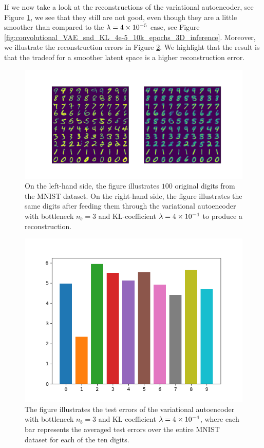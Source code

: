 If we now take a look at the reconstructions of the variational autoencoder, see Figure \ref{fig:convolutional_VAE_snd_KL_4e-4_10k_epochs_3D_inference}, we see that they still are not good, even though they are a little smoother than compared to the $\lambda = \num{4e-5}$ case, see Figure \ref{fig:convolutional_VAE_snd_KL_4e-5_10k_epochs_3D_inference}.
Moreover, we illustrate the reconstruction errors in Figure \ref{fig:convolutional_VAE_snd_KL_4e-4_10k_epochs_3D_errors}. We highlight that the result is that the tradeof for a smoother latent space is a higher reconstruction error.


\begin{figure}
\begin{center}
      \includegraphics[trim = 15mm 10mm 15mm 15mm, clip, width=\linewidth]{convolutional_VAE_snd_KL_4e-4_10k_epochs_3D_inference}
\end{center}
\caption{On the left-hand side, the figure illustrates $100$ original digits from the MNIST dataset. On the right-hand side, the figure illustrates the same digits after feeding them through the variational autoencoder with bottleneck $n_b=3$ and KL-coefficient $\lambda=\num{4e-4}$ to produce a reconstruction.}\label{fig:convolutional_VAE_snd_KL_4e-4_10k_epochs_3D_inference}
\end{figure}


\begin{figure}
\begin{center}
      \includegraphics[width=0.55\linewidth]{convolutional_VAE_snd_KL_4e-4_10k_epochs_3D_errors}
\end{center}
\caption{The figure illustrates the test errors of the variational autoencoder with bottleneck $n_b=3$ and KL-coefficient $\lambda = \num{4e-4}$, where each bar represents the averaged test errors over the entire MNIST dataset for each of the ten digits.}\label{fig:convolutional_VAE_snd_KL_4e-4_10k_epochs_3D_errors}
\end{figure}


